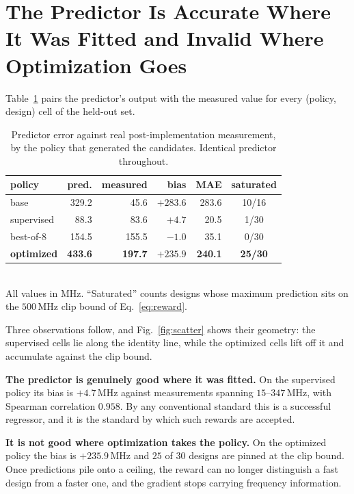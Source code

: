 \documentclass[journal]{IEEEtran}
\begin{document}
\section{The Predictor Is Accurate Where It Was Fitted and Invalid Where
Optimization Goes}
\label{sec:divergence}

Table~\ref{tab:divergence} pairs the predictor's output with the measured value
for every (policy, design) cell of the held-out set.

\begin{table}[t]
\caption{Predictor error against real post-implementation measurement, by the
policy that generated the candidates. Identical predictor throughout.}
\label{tab:divergence}
\centering
\small
\begin{tabular}{lrrrrc}
\toprule
policy & pred. & measured & bias & MAE & saturated \\
\midrule
base            & 329.2 &  45.6 & $+283.6$ & 283.6 & 10/16 \\
supervised      &  88.3 &  83.6 & $+4.7$   &  20.5 & 1/30 \\
best-of-8       & 154.5 & 155.5 & $-1.0$   &  35.1 & 0/30 \\
\textbf{optimized} & \textbf{433.6} & \textbf{197.7} & $\mathbf{+235.9}$ &
\textbf{240.1} & \textbf{25/30} \\
\bottomrule
\end{tabular}
\\[2pt]
\footnotesize All values in MHz. ``Saturated'' counts designs whose maximum
prediction sits on the $500$\,MHz clip bound of Eq.~\eqref{eq:reward}.
\end{table}


Three observations follow, and Fig.~\ref{fig:scatter} shows their geometry: the
supervised cells lie along the identity line, while the optimized cells lift off
it and accumulate against the clip bound.

\textbf{The predictor is genuinely good where it was fitted.} On the supervised
policy its bias is $+4.7$\,MHz against measurements spanning $15$--$347$\,MHz,
with Spearman correlation $0.958$. By any conventional standard this is a
successful regressor, and it is the standard by which such rewards are accepted.

\textbf{It is not good where optimization takes the policy.} On the optimized
policy the bias is $+235.9$\,MHz and $25$ of $30$ designs are pinned at the clip
bound. Once predictions pile onto a ceiling, the reward can no longer
distinguish a fast design from a faster one, and the gradient stops carrying
frequency information.
\end{document}
